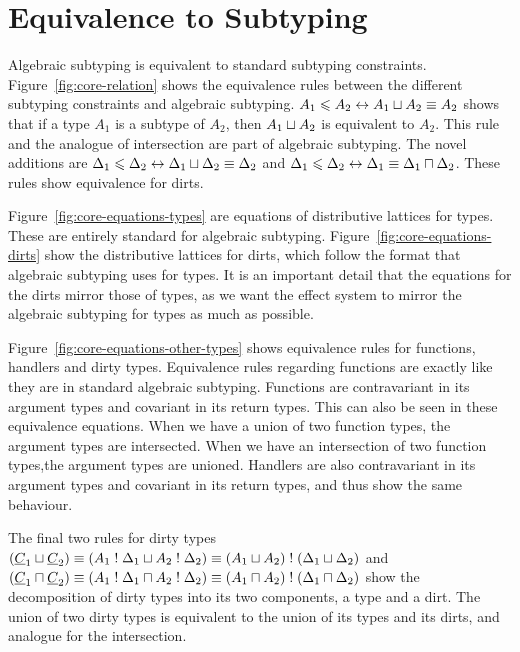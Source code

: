 \section{Equivalence to Subtyping}\label{typesystem}

Algebraic subtyping is equivalent to standard subtyping constraints. \cite{dolan2017algebraic} Figure~\ref{fig:core-relation} shows the equivalence rules between the different subtyping constraints and algebraic subtyping. $A_1 \leqslant A_2 \leftrightarrow A_1 \sqcup A_2 \equiv A_2$ shows that if a type $A_1$ is a subtype of $A_2$, then $A_1 \sqcup A_2$ is equivalent to $A_2$. This rule and the analogue of intersection are part of algebraic subtyping. The novel additions are $\Delta_1 \leqslant \Delta_2 \leftrightarrow \Delta_1 \sqcup \Delta_2 \equiv \Delta_2$ and $\Delta_1 \leqslant \Delta_2 \leftrightarrow \Delta_1 \equiv \Delta_1 \sqcap \Delta_2$. These rules show equivalence for dirts.

Figure~\ref{fig:core-equations-types} are equations of distributive lattices for types. These are entirely standard for algebraic subtyping. Figure~\ref{fig:core-equations-dirts} show the distributive lattices for dirts, which follow the format that algebraic subtyping uses for types. It is an important detail that the equations for the dirts mirror those of types, as we want the effect system to mirror the algebraic subtyping for types as much as possible.

Figure~\ref{fig:core-equations-other-types} shows equivalence rules for functions, handlers and dirty types. Equivalence rules regarding functions are exactly like they are in standard algebraic subtyping. Functions are contravariant in its argument types and covariant in its return types. This can also be seen in these equivalence equations. When we have a union of two function types, the argument types are intersected. When we have an intersection of two function types,the argument types are unioned. Handlers are also contravariant in its argument types and covariant in its return types, and thus show the same behaviour. 

The final two rules for dirty types $(\underline{C}_1 \sqcup \underline{C}_2) \equiv (A_1 \mathrel{!} \Delta_1 \sqcup A_2 \mathrel{!} \Delta_2) \equiv (A_1 \sqcup A_2) \mathrel{!} (\Delta_1 \sqcup \Delta_2)$ and $(\underline{C}_1 \sqcap \underline{C}_2) \equiv (A_1 \mathrel{!} \Delta_1 \sqcap A_2 \mathrel{!} \Delta_2) \equiv (A_1 \sqcap A_2) \mathrel{!} (\Delta_1 \sqcap \Delta_2)$ show the decomposition of dirty types into its two components, a type and a dirt. The union of two dirty types is equivalent to the union of its types and its dirts, and analogue for the intersection. 

